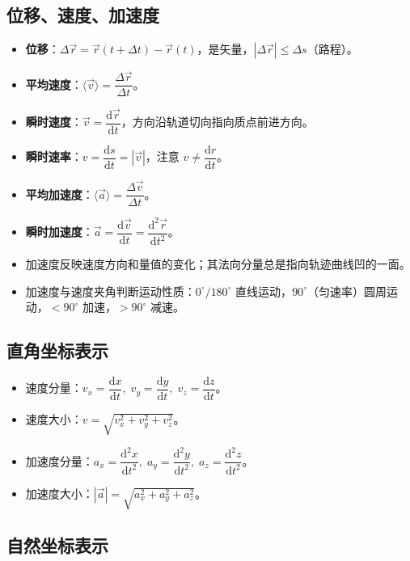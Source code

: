 \documentclass[12pt,a4paper]{ctexart}
\begin{document}
\subsection{位移、速度、加速度}

\begin{itemize}
    \item \textbf{位移}：$\Delta\vec{r} = \vec{r}(t+\Delta t) - \vec{r}(t)$，是矢量，$|\Delta\vec{r}| \le \Delta s$（路程）。
    \item \textbf{平均速度}：$\langle\vec{v}\rangle = \dfrac{\Delta\vec{r}}{\Delta t}$。
    \item \textbf{瞬时速度}：$\vec{v} = \dfrac{\mathrm{d}\vec{r}}{\mathrm{d}t}$，方向沿轨道切向指向质点前进方向。
    \item \textbf{瞬时速率}：$v = \dfrac{\mathrm{d}s}{\mathrm{d}t} = |\vec{v}|$，注意 $v \ne \dfrac{\mathrm{d}r}{\mathrm{d}t}$。
    \item \textbf{平均加速度}：$\langle\vec{a}\rangle = \dfrac{\Delta\vec{v}}{\Delta t}$。
    \item \textbf{瞬时加速度}：$\vec{a} = \dfrac{\mathrm{d}\vec{v}}{\mathrm{d}t} = \dfrac{\mathrm{d}^2\vec{r}}{\mathrm{d}t^2}$。
    \item 加速度反映速度方向和量值的变化；其法向分量总是指向轨迹曲线凹的一面。
    \item 加速度与速度夹角判断运动性质：$0^\circ/180^\circ$ 直线运动，$90^\circ$（匀速率）圆周运动，$<90^\circ$ 加速，$>90^\circ$ 减速。
\end{itemize}

\subsection{直角坐标表示}

\begin{itemize}
    \item 速度分量：$v_x = \dfrac{\mathrm{d}x}{\mathrm{d}t},\; v_y = \dfrac{\mathrm{d}y}{\mathrm{d}t},\; v_z = \dfrac{\mathrm{d}z}{\mathrm{d}t}$。
    \item 速度大小：$v = \sqrt{v_x^2 + v_y^2 + v_z^2}$。
    \item 加速度分量：$a_x = \dfrac{\mathrm{d}^2 x}{\mathrm{d}t^2},\; a_y = \dfrac{\mathrm{d}^2 y}{\mathrm{d}t^2},\; a_z = \dfrac{\mathrm{d}^2 z}{\mathrm{d}t^2}$。
    \item 加速度大小：$|\vec{a}| = \sqrt{a_x^2 + a_y^2 + a_z^2}$。
\end{itemize}

\subsection{自然坐标表示}
\end{document}
